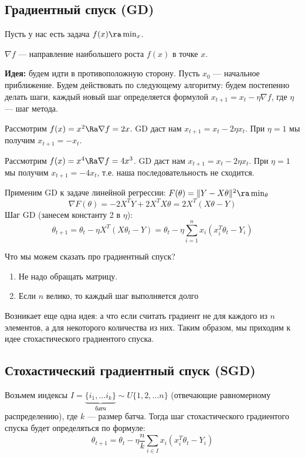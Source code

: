 \subsection{Градиентный спуск (GD)}
Пусть у нас есть задача \(f(x) \ra \min_x\).
\begin{note}
    \(\nabla f\) --- направление наибольшего роста \(f(x)\) в точке \(x\).
\end{note}

\textbf{Идея:} будем идти в противоположную сторону. Пусть \(x_0\) --- начальное приближение. Будем действовать по следующему алгоритму: будем постепенно делать шаги, каждый новый шаг определяется формулой \(x_{t + 1} = x_t - \eta \nabla f\), где \(\eta\) --- шаг метода.

\begin{example}
    Рассмотрим \(f(x) = x^2 \Ra \nabla f = 2x\). GD даст нам \(x_{t + 1} = x_t - 2\eta x_t\). При \(\eta = 1\) мы получим \(x_{t + 1} = - x_t\).
\end{example}

\begin{example}
    Рассмотрим \(f(x) = x^4 \Ra \nabla f = 4x^3\). GD даст нам \(x_{t + 1} = x_t - 2\eta x_t\). При \(\eta = 1\) мы получим \(x_{t + 1} = - 4x_t\), т.е. наша последовательность не сходится.
\end{example}

Применим GD к задаче линейной регрессии: \(F(\theta) = \|Y - X\theta\|^2 \ra \min_\theta\)
\[\nabla F(\theta) = -2X^TY + 2X^TX\theta = 2X^T(X\theta - Y)\]
Шаг GD (занесем константу 2 в \(\eta\)):
\[\theta_{t + 1} = \theta_t - \eta X^T(X\theta_t - Y) = \theta_t - \eta\sum_{i = 1}^n x_i(x_i^T\theta_t - Y_i)\]

Что мы можем сказать про градиентный спуск?
\begin{enumerate}
    \item[\(+\)] Не надо обращать матрицу.
    \item[\(-\)] Если \(n\) велико, то каждый шаг выполняется долго
\end{enumerate}

Возникает еще одна идея: а что если считать градиент не для каждого из \(n\) элементов, а для некоторого количества из них. Таким образом, мы приходим к идее стохастического градиентого спуска.

\subsection{Стохастический градиентный спуск (SGD)}
Возьмем индексы \(I = \underbrace{\{i_1, \dots i_k\}}_{\text{батч}} \sim U\{1, 2, \dots n\}\) (отвечающие равномерному распределению), где \(k\) --- размер батча. Тогда шаг стохастического градиентого спуска будет определяться по формуле:
\[\theta_{t + 1} = \theta_t - \eta\frac{n}{k}\sum_{i \in I}x_i(x_i^T\theta_t - Y_i)\]

